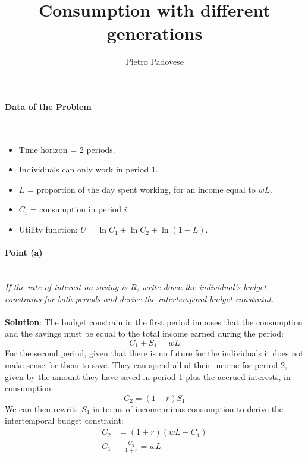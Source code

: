 \documentclass[12pt]{article}
\author{Pietro Padovese}
\title{Consumption with different generations}
\newcommand{\myparagraph}[1]{\paragraph{#1}\mbox{}\\}
\begin{document}
\maketitle

\myparagraph{Data of the Problem}
\begin{itemize}
\item Time horizon = 2 periods.
\item Individuals can only work in period 1.
\item $L$ = proportion of the day spent working, for an income equal to $wL$.
\item $C_i$ = consumption in period $i$.
\item Utility function: $U = \ln C_1 + \ln C_2 + \ln (1 - L)$.
\end{itemize}
\myparagraph{Point (a)}
\textit{If the rate of interest on saving is $R$, write down the individual's budget constrains for both periods and derive the intertemporal budget constraint}. \\\\
\textbf{Solution}:
The budget constrain in the first period imposes that the consumption and the savings must be equal to the total income earned during the period: 
\begin{equation}
C_1 + S_1 = wL
\end{equation}
For the second period, given that there is no future for the individuals it does not make sense for them to save. They can spend all of their income for period 2, given by the amount they have saved in period 1 plus the accrued interests, in consumption: 
\begin{equation}
C_2 = (1 + r)S_1
\end{equation}
We can then rewrite $S_1$ in terms of income minus consumption to derive the intertemporal budget constraint:
\begin{align*}
C_2 &= (1 + r)(wL - C_1) \\
C_1 & + \frac{C_2}{1 +r} = wL
\end{align*}
\end{document}
